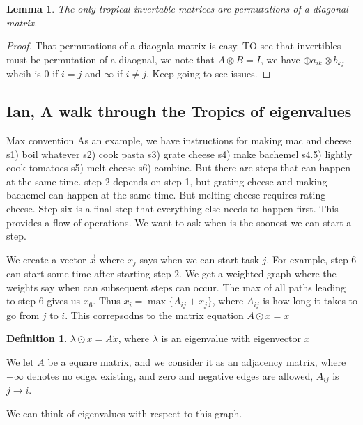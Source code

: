 \documentclass[11pt]{article}
\newtheorem{protolemma}[prototheorem]{Lemma}
\newenvironment{lemma}
   {\begin{protolemma}}
   {\end{protolemma}}
\theoremstyle{definition}
\newtheorem{protodefinition}{Definition}[section]
\newenvironment{define}
   {\begin{protodefinition}}
   {\end{protodefinition}}
\begin{document}
\begin{lemma}
    The only tropical invertable matrices are permutations of a diagonal matrix.
\end{lemma}

\begin{proof}
    That permutations of a diaognla matrix is easy. TO see that invertibles must be permutation of a diaognal, we note that $A \otimes B = I$, we have $\oplus a_{ik} \otimes b_{kj}$ whcih is $0$ if $i =j$ and $\infty$ if $i \neq j$. Keep going to see issues.
\end{proof}



\subsection{Ian, A walk through the Tropics of eigenvalues}

Max convention
As an example, we have instructions for making mac and cheese
s1)  boil whatever
s2) cook pasta
s3) grate cheese
s4) make bachemel
s4.5) lightly cook tomatoes
s5) melt cheese
s6) combine. But there are steps that can happen at the same time. step 2 depends on step 1, but grating cheese and making bachemel can happen at the same time. But melting cheese requires rating cheese. Step six is a final step that everything else needs to happen first. This provides a flow of operations. We want to ask when is the soonest we can start a step.

We create a vector $\overrightarrow{x}$ where $x_j$ says when we can start task $j$. For example, step 6 can start some time after starting step $2$. We get a weighted graph where the weights say when can subsequent steps can occur. The max of all paths leading to step $6$ gives us $x_6$. Thus $x_i = \max\{A_{ij} +x_j\}$, where $A_{ij}$ is how long it takes to go from $j$ to $i$. This correpsodns to the matrix equation $A \odot x = x$



\begin{define}
$\lambda \odot x = A \dot x$, where $\lambda$ is an eigenvalue with eigenvector $x$
\end{define}


We let $A$ be a equare matrix, and we consider it as an adjacency matrix, where $-\infty$ denotes no edge. existing, and zero and negative edges are allowed, $A_{ij}$ is $j \rightarrow i$.


We can think of eigenvalues with respect to this graph.
\end{document}
